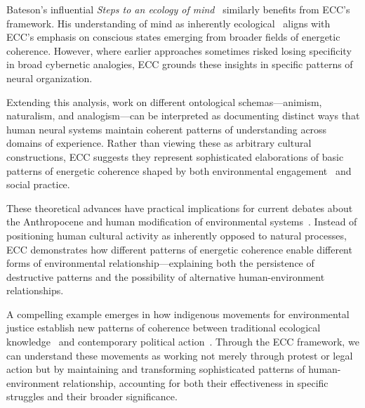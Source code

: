 Bateson's influential \textit{Steps to an ecology of mind}~\cite{bateson1972steps,bateson1979mind} similarly benefits from ECC's framework. His understanding of mind as inherently ecological~ aligns with ECC's emphasis on conscious states emerging from broader fields of energetic coherence. However, where earlier approaches sometimes risked losing specificity in broad cybernetic analogies, ECC grounds these insights in specific patterns of neural organization.

Extending this analysis, work on different ontological schemas—animism, naturalism, and analogism—can be interpreted as documenting distinct ways that human neural systems maintain coherent patterns of understanding across domains of experience. Rather than viewing these as arbitrary cultural constructions, ECC suggests they represent sophisticated elaborations of basic patterns of energetic coherence shaped by both environmental engagement~ and social practice.

These theoretical advances have practical implications for current debates about the Anthropocene and human modification of environmental systems~\cite{haraway2016staying,tsing2005friction}. Instead of positioning human cultural activity as inherently opposed to natural processes, ECC demonstrates how different patterns of energetic coherence enable different forms of environmental relationship—explaining both the persistence of destructive patterns and the possibility of alternative human-environment relationships.

A compelling example emerges in how indigenous movements for environmental justice establish new patterns of coherence between traditional ecological knowledge~ and contemporary political action~\cite{nadasdy2007gift,nadasdy2003hunters}. Through the ECC framework, we can understand these movements as working not merely through protest or legal action but by maintaining and transforming sophisticated patterns of human-environment relationship, accounting for both their effectiveness in specific struggles and their broader significance.

